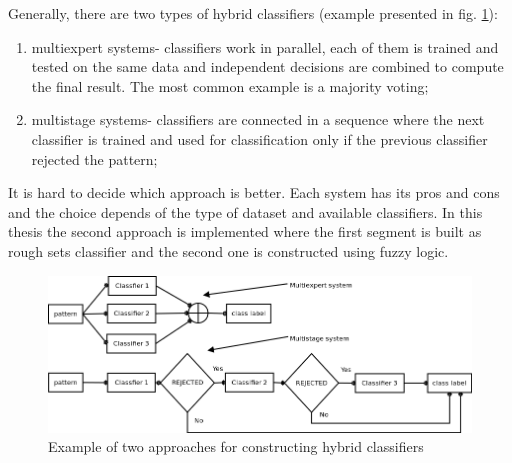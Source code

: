 Generally, there are two types of hybrid classifiers (example presented in fig.
\ref{fig:hybrid}):
\begin{enumerate}
    \item multiexpert systems- classifiers work in parallel, each of them is
        trained and tested on the same data and independent decisions are
        combined to compute the final result. The most common example is a
        majority voting;
    \item multistage systems- classifiers are connected in a sequence where the
        next classifier is trained and used for classification only if the
        previous classifier rejected the pattern;
\end{enumerate}
It is hard to decide which approach is better. Each system has its pros
and cons and the choice depends of the type of dataset and available
classifiers. In this thesis the second approach is implemented where the first
segment is built as rough sets classifier and the second one is constructed
using fuzzy logic.
\begin{figure}[H]  
    \begin{center}
        \includegraphics[width=\textwidth]{fig/hybrid.png}
    \end{center}
    \caption{Example of two approaches for constructing hybrid classifiers}
    \label{fig:hybrid}
\end{figure}
